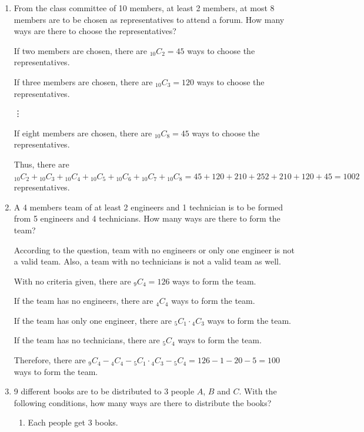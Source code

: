 \documentclass{report}
\newcommand\comb[2][^n]{{}_{#1}C_{#2}}
\begin{document}
\begin{multicols}{2}
\begin{enumerate}
    \item From the class committee of 10 members, at least 2 members, at most 8 members
          are to be chosen as representatives to attend a forum. How many ways are there
          to choose the representatives? \sol{}

          If two members are chosen, there are $\comb[10]{2} = 45$ ways to choose the
          representatives.

          If three members are chosen, there are $\comb[10]{3} = 120$ ways to choose the
          representatives.

          \vdots

          If eight members are chosen, there are $\comb[10]{8} = 45$ ways to choose the
          representatives.

          Thus, there are $\comb[10]{2} + \comb[10]{3} + \comb[10]{4} + \comb[10]{5} +
            \comb[10]{6} + \comb[10]{7} + \comb[10]{8} = 45 + 120 + 210 + 252 + 210 + 120 +
            45 = 1002$ representatives.

    \item A 4 members team of at least 2 engineers and 1 technician is to be formed from
          5 engineers and 4 technicians. How many ways are there to form the team? \sol{}

          According to the question, team with no engineers or only one engineer is not a
          valid team. Also, a team with no technicians is not a valid team as well.

          With no criteria given, there are $\comb[9]{4} = 126$ ways to form the team.

          If the team has no engineers, there are $\comb[4]{4}$ ways to form the team.

          If the team has only one engineer, there are $\comb[5]{1} \cdot \comb[4]{3}$
          ways to form the team.

          If the team has no technicians, there are $\comb[5]{4}$ ways to form the team.

          Therefore, there are $\comb[9]{4} - \comb[4]{4} - \comb[5]{1} \cdot \comb[4]{3}
            - \comb[5]{4} = 126 - 1 - 20 - 5 = 100$ ways to form the team.

    \item 9 different books are to be distributed to 3 people $A$, $B$ and $C$. With the following conditions, how many ways are there to distribute the books?
          \begin{enumerate}
            \item Each people get 3 books. \sol{}


\end{enumerate}
\end{enumerate}
\end{multicols}
\end{document}
